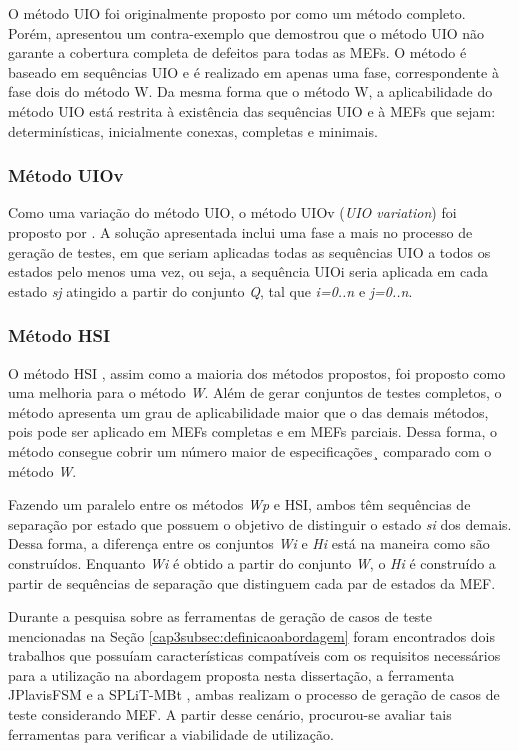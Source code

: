 O método UIO foi originalmente proposto por \citet{sabnani1988protocol} como um método completo. Porém, \citet{vuong1989uiov} apresentou um contra-exemplo que demostrou que o método UIO não garante a cobertura completa de defeitos para todas as MEFs. O método é baseado em sequências UIO e é realizado em apenas uma fase, correspondente à fase dois do método W. Da mesma forma que o método W, a aplicabilidade do método UIO está restrita à existência das sequências UIO e à MEFs que sejam: determinísticas, inicialmente conexas, completas e minimais.  

\subsubsection{Método UIOv}

Como uma variação do método UIO, o método UIOv (\textit{UIO variation}) foi proposto por \citet{vuong1989uiov}. A solução apresentada inclui uma fase a mais no processo de geração de testes, em que seriam aplicadas todas as sequências UIO a todos os estados pelo menos uma vez, ou seja, a sequência UIOi  seria aplicada em cada estado \textit{sj}  atingido a partir do conjunto \textit{Q}, tal que \textit{i={0..n}} e \textit{j={0..n}}.

\subsubsection{Método HSI}
\label{cap2subsubsec:hsi}

O método HSI \cite{petrenko1994nondeterministic}, assim como a maioria dos métodos propostos, foi proposto como uma melhoria para o método \textit{W}. Além de gerar conjuntos de testes completos, o método apresenta um grau de aplicabilidade maior que o das demais métodos, pois pode ser aplicado em MEFs completas e em MEFs parciais. Dessa forma, o método consegue cobrir um número maior de especificações¸ comparado com o método \textit{W}.

Fazendo um paralelo entre os métodos \textit{Wp} e HSI, ambos têm sequências de separação por estado que possuem o objetivo de distinguir o estado \textit{si} dos demais. Dessa forma, a diferença entre os conjuntos \textit{Wi} e \textit{Hi} está na maneira como são construídos. Enquanto \textit{Wi} é obtido a partir do conjunto  \textit{W}, o \textit{Hi} é construído a partir de sequências de separação que distinguem cada par de estados da  MEF.  

Durante a pesquisa sobre as ferramentas de geração de casos de teste mencionadas na Seção \ref{cap3subsec:definicaoabordagem} foram encontrados dois trabalhos que possuíam características compatíveis com os requisitos necessários para a utilização na abordagem proposta nesta dissertação, a ferramenta JPlavisFSM \cite{pinheiro2012jplavisfsm} e a SPLiT-MBt \cite{costa2016split}, ambas realizam o processo de geração de casos de teste considerando MEF. A partir desse cenário, procurou-se avaliar tais ferramentas para verificar a viabilidade de utilização.


